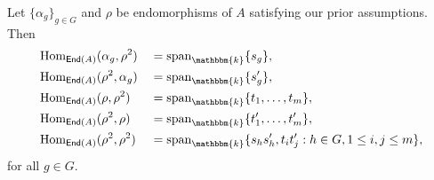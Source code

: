 
\noindent\begin{lemma}\label{HomDimensions} Let $\{\alpha_g\}_{g \in G}$ and $\rho$ be endomorphisms of $A$ satisfying our prior assumptions. Then
\begin{alignat*}{2}
&\homset_{\textcat{End}(A)}(\alpha_g, \rho^2) &&= \textup{span}_\mathbbm{k}\{s_g\},\\%
&\homset_{\textcat{End}(A)}(\rho^2, \alpha_g) &&= \textup{span}_\mathbbm{k}\{s_g'\},\\%
&\homset_{\textcat{End}(A)}(\rho, \rho^2) &&= \textup{span}_\mathbbm{k}\{t_1, \dots, t_m\},\\%
&\homset_{\textcat{End}(A)}(\rho^2, \rho) &&= \textup{span}_\mathbbm{k}\{t_1', \dots, t_m'\},\\%
&\homset_{\textcat{End}(A)}(\rho^2, \rho^2) &&= \textup{span}_\mathbbm{k}\{s_hs_h', t_it_j' : h \in G, 1 \leq i, j \leq m\},%
\end{alignat*}
\noindent for all $g \in G$.\\
\end{lemma}

